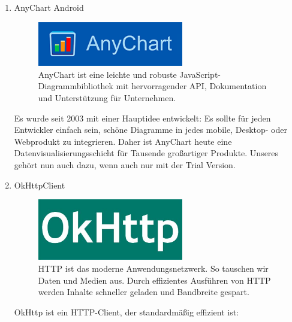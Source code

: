 \documentclass[10pt]{scrartcl}
\begin{document}
\begin{enumerate}
	
	\item 
	AnyChart Android

\begin{figure}[H]
	\centering
	\includegraphics[width=0.6\textwidth]{Bilder/BibliothekenLogos/Anychart.png}
	\caption{AnyChart ist eine leichte und robuste JavaScript-Diagrammbibliothek mit hervorragender API, Dokumentation und Unterstützung für Unternehmen.}
\end{figure}


Es wurde seit 2003 mit einer Hauptidee entwickelt: Es sollte für jeden Entwickler einfach sein, schöne Diagramme in jedes mobile, Desktop- oder Webprodukt zu integrieren. Daher ist AnyChart heute eine Datenvisualisierungsschicht für Tausende großartiger Produkte. Unseres gehört nun auch dazu, wenn auch nur mit der Trial Version.


	\item 
	OkHttpClient

\begin{figure}[H]
	\centering
	\includegraphics[width=0.6\textwidth]{Bilder/BibliothekenLogos/OKHTTP.jpg}
	\caption{HTTP ist das moderne Anwendungsnetzwerk. So tauschen wir Daten und Medien aus. Durch effizientes Ausführen von HTTP werden Inhalte schneller geladen und Bandbreite gespart.}
\end{figure}


OkHttp ist ein HTTP-Client, der standardmäßig effizient ist:


\end{enumerate}
\end{document}
